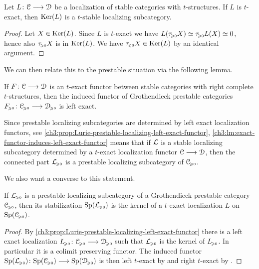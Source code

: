 \begin{lemma}
    \label{ch3:lm:t-exact-then-t-stable-kernel}
    Let $L\:\C\to\D$ be a localization of stable categories with $t$-structures. If $L$ is $t$-exact, then $\Ker(L)$ is a $t$-stable localizing subcategory.  
\end{lemma}
\begin{proof}
    Let $X\in \Ker(L)$. Since $L$ is $t$-exact we have $L(\tau\geqz X)\simeq \tau\geqz L(X)\simeq 0$, hence also $\tau\geqz X$ is in $\Ker(L)$. We have $\tau\leqz X\in \Ker(L)$ by an identical argument.  
\end{proof}

We can then relate this to the prestable situation via the following lemma. 

\begin{lemma}
    \label{ch3:lm:exact-functor-induces-left-exact-functor}
    If $F\:\C\to \D$ is an $t$-exact functor between stable categories with right complete $t$-structures, then the induced functor of Grothendieck prestable categories $F\geqz\:\C\geqz\to\D\geqz$ is left exact. 
\end{lemma}

\begin{remark}
    \label{ch3:rm:kernel-of-t-exact-then-prestable-localizing}
    Since prestable localizing subcategories are determined by left exact localization functors, see \cref{ch3:prop:Lurie-prestable-localizing-left-exact-functor}, \cref{ch3:lm:exact-functor-induces-left-exact-functor} means that if $\L$ is a stable localizing subcategory determined by a $t$-exact localization functor $\C\to \D$, then the connected part $\L\geqz$ is a prestable localizing subcategory of $\C\geqz$. 
\end{remark}

We also want a converse to this statement.

\begin{lemma}
    \label{ch3:lm:prestable-localizing-then-kernel-of-t-exact}
    If $\L\geqz$ is a prestable localizing subcategory of a Grothendieck prestable category $\C\geqz$, then its stabilization $\Sp(\L\geqz)$ is the kernel of a $t$-exact localization $L$ on $\Sp(\C\geqz)$.  
\end{lemma}
\begin{proof}
    By \cref{ch3:prop:Lurie-prestable-localizing-left-exact-functor} there is a left exact localization $L\geqz \: \C\geqz \to \D\geqz$ such that $\L\geqz$ is the kernel of $L\geqz$. In particular it is a colimit preserving functor. The induced functor $\Sp(\L\geqz)\:\Sp(\C\geqz)\to \Sp(\D\geqz)$ is then left $t$-exact by \cite[C.3.2.1]{lurie_SAG} and right $t$-exact by \cite[C.3.1.1]{lurie_SAG}. 
\end{proof}


